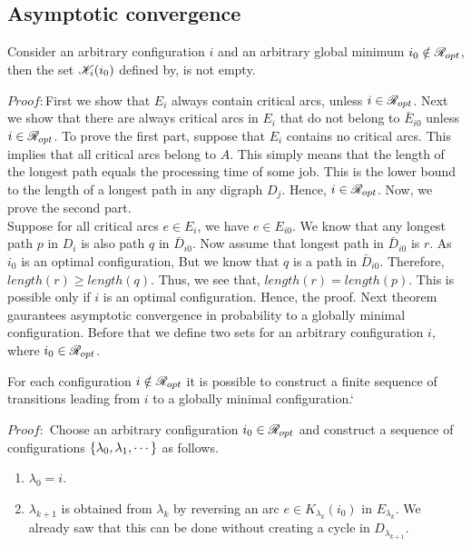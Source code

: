 \documentclass[letterpaper,english,10pt]{article}
\begin{document}
\subsection{Asymptotic convergence}
\begin{lem}
Consider an arbitrary configuration $i$ and an arbitrary global minimum $i_0 \notin \mathscr{R}_{opt}$, then the set 
$\mathscr{K}_i(i_0)$ defined by,
is not empty.
\end{lem} 
$Proof:$First we show that $E_i$ always contain critical arcs, unless $i \in \mathscr{R}_{opt}$. 
Next we show that there are always critical arcs in $E_i$ that do not belong to $\bar{E}_{i0}$ unless  $i \in \mathscr{R}_{opt}$.
To prove the first part, suppose that $E_i$ contains no critical arcs. This implies that all critical arcs belong to $A$. This simply means that the length of the longest path equals the processing time of some job. This is the lower bound to the length of a longest path in any digraph $D_j$. Hence, $i \in \mathscr{R}_{opt}$.
Now, we prove the second part.\\ 
Suppose for all critical arcs $e \in E_i$, we have $e \in E_{i0}$. We know that any longest path $p$ in $D_i$ is also path $q$ in $\bar{D}_{i0}$. 
Now assume that longest path in $\bar{D}_{i0}$ is $r$. As $i_0$ is an optimal configuration,
But we know that $q$ is a path in $\bar{D}_{i0}$. Therefore, $length(r) \geq length(q)$. Thus, we see that, $length(r) = length(p)$. This is possible only if $i$ is an optimal configuration. Hence, the proof.
Next theorem gaurantees asymptotic convergence in probability to a globally minimal configuration.
Before that we define two sets for an arbitrary configuration $i$,
where $i_0 \in \mathscr{R}_{opt}$.
\begin{thm}
For each configuration $i \notin \mathscr{R}_{opt}$ it is possible to construct a finite sequence of transitions leading from $i$ to a globally minimal configuration.`
\end{thm}
$Proof:$ Choose an arbitrary configuration $i_0 \in \mathscr{R}_{opt}$ and construct a sequence of configurations $\left\{\lambda_0, \lambda_1,\cdots\right\}$ as follows.
\begin{enumerate}
\item $\lambda_0 = i$.
\item $\lambda_{k+1}$ is obtained from $\lambda_k$ by reversing an arc $e \in K_{\lambda_k}(i_0)$ in $E_{\lambda_k}$. We already saw that this can be done without creating a cycle in $D_{\lambda_{k+1}}$.
\end{enumerate}
\end{document}
